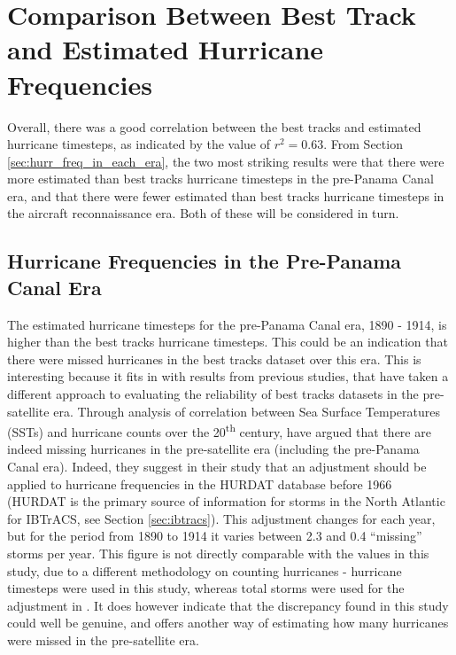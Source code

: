 \documentclass[pdftex,12pt,a4paper]{report}
\newcommand{\ts}{\textsuperscript}
\begin{document}
\section{Comparison Between Best Track and Estimated Hurricane Frequencies}
\label{sec:freq_comparison}
Overall, there was a good correlation between the best tracks and estimated hurricane timesteps, as
indicated by the value of $r^2 = 0.63$. From Section \ref{sec:hurr_freq_in_each_era}, the two most
striking results were that there were more estimated than best tracks hurricane timesteps in the
pre-Panama Canal era, and that there were fewer estimated than best tracks hurricane timesteps in
the aircraft reconnaissance era. Both of these will be considered in turn.

\subsection{Hurricane Frequencies in the Pre-Panama Canal Era}
The estimated hurricane timesteps for the pre-Panama Canal era, 1890 - 1914, is higher than the best
tracks hurricane timesteps. This could be an indication that there were missed hurricanes in the
best tracks dataset over this era. This is interesting because it fits in with results from previous
studies, that have taken a different approach to evaluating the reliability of best tracks datasets
in the pre-satellite era. Through analysis of correlation between Sea Surface Temperatures (SSTs)
and hurricane counts over the 20\ts{th} century, \textcite{vecchi2008estimates} have argued that
there are indeed missing hurricanes in the pre-satellite era (including the pre-Panama Canal era).
Indeed, they suggest in their study that an adjustment should be applied to hurricane frequencies in
the HURDAT database before 1966 (HURDAT is the primary source of information for storms in the North
Atlantic for IBTrACS, see Section \ref{sec:ibtracs}). This adjustment changes for each year, but for
the period from 1890 to 1914 it varies between 2.3 and 0.4 ``missing'' storms per year. This figure
is not directly comparable with the values in this study, due to a different methodology on counting
hurricanes - hurricane timesteps were used in this study, whereas total storms were used for the
adjustment in \textcite{vecchi2008estimates}. It does however indicate that the discrepancy found in
this study could well be genuine, and offers another way of estimating how many hurricanes were
missed in the pre-satellite era.
\end{document}
